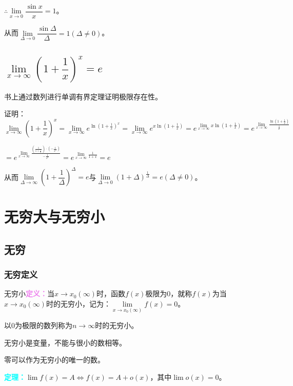 \documentclass[UTF8, 12pt]{ctexart}
\begin{document}
        $\therefore\lim\limits_{x\to 0}\dfrac{\sin x}{x}=1$。

        从而$\lim\limits_{\Delta\to 0}\dfrac{\sin\Delta}{\Delta}=1(\Delta\neq 0)$。

        \subsection{\texorpdfstring{$\lim\limits_{x\to\infty}\left(1+\dfrac{1}{x}\right)^x=e$}{}}

        书上通过数列进行单调有界定理证明极限存在性。

        证明：$\lim\limits_{x\to\infty}\left(1+\dfrac{1}{x}\right)^x=\lim\limits_{x\to\infty}e^{\ln(1+\frac{1}{x})^x}=\lim\limits_{x\to\infty}e^{x\ln(1+\frac{1}{x})}=e^{\lim\limits_{x\to\infty}x\ln(1+\frac{1}{x})}=e^{\lim\limits_{x\to\infty}\frac{\ln(1+\frac{1}{x})}{\frac{1}{x}}}$

        $=e^{\lim\limits_{x\to\infty}\frac{\left(\frac{1}{1+\frac{1}{x}}\right)\cdot\left(-\frac{1}{x^2}\right)}{-\frac{1}{x^2}}}=e^{\lim\limits_{x\to\infty}\frac{1}{1+x}}=e$\medskip

        从而$\lim\limits_{\Delta\to\infty}\left(1+\dfrac{1}{\Delta}\right)^\Delta=e$与$\lim\limits_{\Delta\to 0}\left(1+\Delta\right)^{\frac{1}{\Delta}}=e(\Delta\neq 0)$。

        \section{无穷大与无穷小}

        \subsection{无穷}

        \subsubsection{无穷定义}

        无穷小\textcolor{violet}{\textbf{定义：}}当$x\to x_0(\infty)$时，函数$f(x)$极限为0，就称$f(x)$为当$x\to x_0(\infty)$时的无穷小，记为：$\lim\limits_{x\to x_0(\infty)}f(x)=0$。

        以0为极限的数列称为$n\to\infty$时的无穷小。

        无穷小是变量，不能与很小的数相等。

        零可以作为无穷小的唯一的数。

        \textcolor{aqua}{\textbf{定理：}}$\lim f(x)=A\Leftrightarrow f(x)=A+o(x)$，其中$\lim o(x)=0$。
\end{document}
